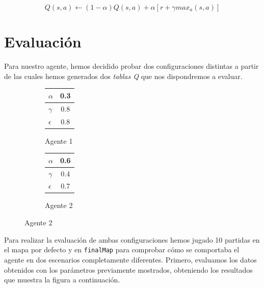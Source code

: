 \documentclass[12pt]{article}
\begin{document}
\begin{equation*}
	Q(s,a)\gets(1-\alpha) Q(s,a)+\alpha [r+\gamma max_a (s,a)]
\end{equation*}

\newpage
\section{Evaluación}
Para nuestro agente, hemos decidido probar dos configuraciones distintas a partir de las cuales hemos generados dos \textit{tablas Q} que nos dispondremos a evaluar.

\begin{figure}[h]
    \centering
    \begin{subfigure}{.5\textwidth}
        \centering
        \begin{tabular}{ l | c}
        	\hline
        	$\alpha$	& 0.3 \\ \hline
        	$\gamma$	& 0.8 \\ \hline
        	$\epsilon$	& 0.8 \\
        	\hline
        \end{tabular}
        \caption{Agente 1}
        \label{fig:sub1}
    \end{subfigure}%
    \begin{subfigure}{.5\textwidth}
        \centering
        \begin{tabular}{ l | c}
        	\hline
        	$\alpha$	& 0.6 \\ \hline
        	$\gamma$	& 0.4 \\ \hline
        	$\epsilon$	& 0.7 \\
        	\hline
        \end{tabular}
        \caption{Agente 2}
        \label{fig:sub2}
    \end{subfigure}
\end{figure}

Para realizar la evaluación de ambas configuraciones hemos jugado 10 partidas en el mapa por defecto y en \texttt{finalMap} para comprobar cómo se comportaba el agente en dos escenarios completamente diferentes. Primero, evaluamos los datos obtenidos con los parámetros previamente mostrados, obteniendo los resultados que muestra la figura a continuación.
\end{document}
